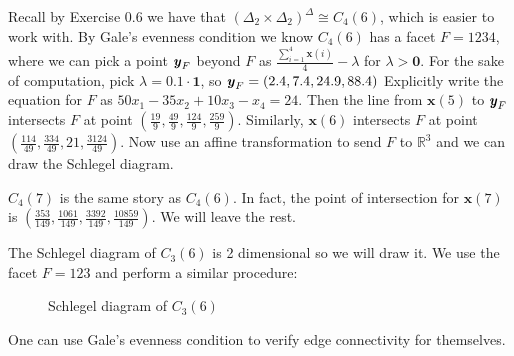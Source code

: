 \documentclass{article}
\begin{document}
\begin{enumerate}
\begin{solution}
    Recall by Exercise 0.6 we have that $(\Delta_2 \times \Delta_2)^{\Delta} \cong C_4(6)$, which is easier to work with. By Gale's evenness condition we know $C_4(6)$ has a facet $F = 1234$, where we can pick a point $\textbf{\textit{y}}_F$ beyond $F$ as $\frac{\sum_{i=1}^4 \textbf{x}(i)}{4} - \lambda$ for $\lambda > \textbf{0}$. For the sake of computation, pick $\lambda = 0.1\cdot\textbf{1}$, so $\textbf{\textit{y}}_F = (2.4, 7.4, 24.9, 88.4)$ Explicitly write the equation for $F$ as $50x_1-35x_2+10x_3-x_4=24$. Then the line from $\textbf{x}(5)$ to $\textbf{\textit{y}}_F$ intersects $F$ at point $(\frac{19}{9}, \frac{49}{9}, \frac{124}{9},\frac{259}{9})$. Similarly, $\textbf{x}(6)$ intersects $F$ at point $(\frac{114}{49},\frac{334}{49},21,\frac{3124}{49})$. Now use an affine transformation to send $F$ to $\mathbb{R}^3$ and we can draw the Schlegel diagram.

    $C_4(7)$ is the same story as $C_4(6)$. In fact, the point of intersection for $\textbf{x}(7)$ is $(\frac{353}{149},\frac{1061}{149},\frac{3392}{149},\frac{10859}{149})$. We will leave the rest. 

    The Schlegel diagram of $C_3(6)$ is 2 dimensional so we will draw it. We use the facet $F = 123$ and perform a similar procedure:

\begin{figure}[h]
    \centering
{}
\caption{Schlegel diagram of $C_3(6)$}
\end{figure}

One can use Gale's evenness condition to verify edge connectivity for themselves.
\end{solution}


\end{enumerate}
\end{document}
